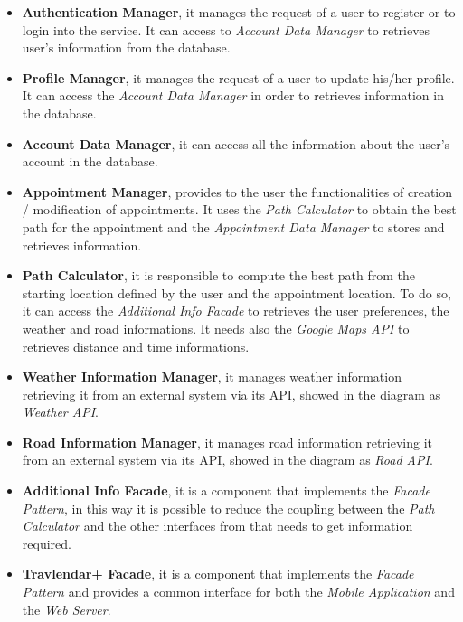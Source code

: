 \begin{itemize}
	\item \textbf{Authentication Manager}, it manages the request of a user to register or to login into the service. It can access to \emph{Account Data Manager} to retrieves user's information from the database.
	\item \textbf{Profile Manager}, it manages the request of a user to update his/her profile. It can access the \emph{Account Data Manager} in order to retrieves information in the database.
	\item \textbf{Account Data Manager}, it can access all the information about the user's account in the database. 
	\item \textbf{Appointment Manager}, provides to the user the functionalities of creation / modification of appointments. It uses the \emph{Path Calculator} to obtain the best path for the appointment and the \emph{Appointment Data Manager} to stores and retrieves information.
	\item \textbf{Path Calculator}, it is responsible to compute the best path from the starting location defined by the user and the appointment location. To do so, it can access the \emph{Additional Info Facade} to retrieves the user preferences, the weather and road informations. It needs also the \emph{Google Maps API} to retrieves distance and time informations.
	\item \textbf{Weather Information Manager}, it manages weather information retrieving it from an external system via its API, showed in the diagram as \emph{Weather API}.
		\item \textbf{Road Information Manager}, it manages road information retrieving it from an external system via its API, showed in the diagram as \emph{Road API}.
	\item \textbf{Additional Info Facade}, it is a component that implements the \emph{Facade Pattern}, in this way it is possible to reduce the coupling between the \emph{Path Calculator} and the other interfaces from that needs to get information required.
	\item \textbf{Travlendar+ Facade}, it is a component that implements the \emph{Facade Pattern} and provides a common interface for both the \emph{Mobile Application} and the \emph{Web Server}.	
\end{itemize}

